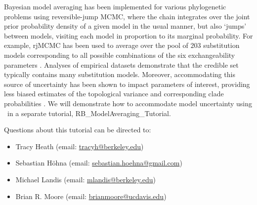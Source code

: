 Bayesian model averaging has been implemented for various phylogenetic problems using reversible-jump MCMC, where the chain integrates over the joint prior probability density of a given model in the usual manner, but also `jumps' between models, visiting each model in proportion to its marginal probability.
For example, rjMCMC has been used to average over the pool of $203$ substitution models corresponding to all possible combinations of the six exchangeability parameters \citep{huelsenbeck04}.
Analyses of empirical datasets demonstrate that the credible set typically contains many substitution models.
Moreover, accommodating this source of uncertainty has been shown to impact parameters of interest, providing less biased estimates of the topological variance and corresponding clade probabilities \citep {huelsenbeck04}.
We will demonstrate how to accommodate model uncertainty using \RevBayes~in a separate tutorial, RB\_ModelAveraging\_Tutorial.



%




\newpage
\vspace{5cm}
Questions about this tutorial can be directed to: \\\vspace{-10mm}
\begin{itemize}
\item Tracy Heath (email: \href{mailto:tracyh@berkeley.edu}{tracyh@berkeley.edu}) \\\vspace{-8mm}
\item Sebastian H\"{o}hna (email: \href{mailto:sebastian.hoehna@gmail.com}{sebastian.hoehna@gmail.com}) \\\vspace{-8mm}
\item Michael Landis (email: \href{mailto:mlandis@berkeley.edu}{mlandis@berkeley.edu}) \\\vspace{-8mm} 
\item Brian R. Moore (email: \href{mailto:brianmoore@ucdavis.edu}{brianmoore@ucdavis.edu}) \\\vspace{-8mm}
\end{itemize}






